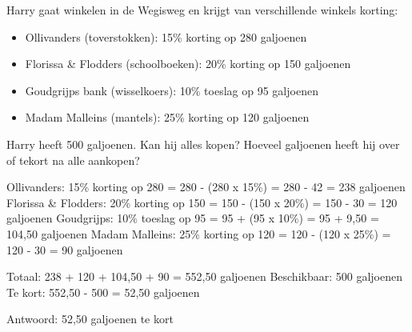 \begin{opgave}
Harry gaat winkelen in de Wegisweg en krijgt van verschillende winkels korting:

\begin{itemize}
\item Ollivanders (toverstokken): 15\% korting op 280 galjoenen
\item Florissa \& Flodders (schoolboeken): 20\% korting op 150 galjoenen  
\item Goudgrijps bank (wisselkoers): 10\% toeslag op 95 galjoenen
\item Madam Malleins (mantels): 25\% korting op 120 galjoenen
\end{itemize}

Harry heeft 500 galjoenen. Kan hij alles kopen? Hoeveel galjoenen heeft hij
over of tekort na alle aankopen?
\end{opgave}

\begin{oplossing}
Ollivanders: 15\% korting op 280 = 280 - (280 x 15\%) = 280 - 42 = 238 galjoenen
Florissa \& Flodders: 20\% korting op 150 = 150 - (150 x 20\%) = 150 - 30 = 120 galjoenen
Goudgrijps: 10\% toeslag op 95 = 95 + (95 x 10\%) = 95 + 9,50 = 104,50 galjoenen
Madam Malleins: 25\% korting op 120 = 120 - (120 x 25\%) = 120 - 30 = 90 galjoenen

Totaal: 238 + 120 + 104,50 + 90 = 552,50 galjoenen
Beschikbaar: 500 galjoenen
Te kort: 552,50 - 500 = 52,50 galjoenen

Antwoord: 52,50 galjoenen te kort
\end{oplossing}